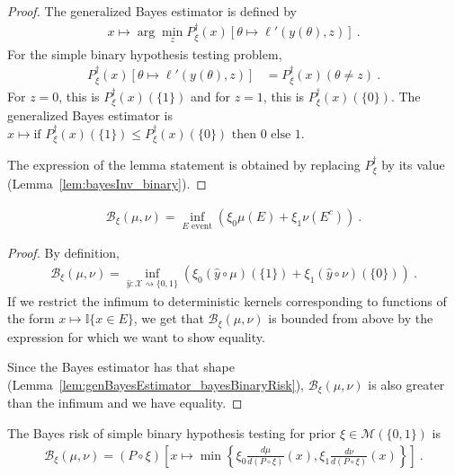 \begin{proof}\leanok
{}
The generalized Bayes estimator is defined by
\begin{align*}
x \mapsto \arg\min_z P_\xi^\dagger(x)\left[\theta \mapsto \ell'(y(\theta), z)\right] \: .
\end{align*}
For the simple binary hypothesis testing problem,
\begin{align*}
P_\xi^\dagger(x)\left[\theta \mapsto \ell'(y(\theta), z)\right]
&= P_\xi^\dagger(x)(\theta \ne z)
\: .
\end{align*}
For $z = 0$, this is $P_\xi^\dagger(x)(\{1\})$ and for $z = 1$, this is $P_\xi^\dagger(x)(\{0\})$.
The generalized Bayes estimator is $x \mapsto \text{if } P_\xi^\dagger(x)(\{1\}) \le P_\xi^\dagger(x)(\{0\}) \text{ then } 0 \text{ else } 1$.

The expression of the lemma statement is obtained by replacing $P_\xi^\dagger$ by its value (Lemma~\ref{lem:bayesInv_binary}).
\end{proof}


\begin{lemma}
  \label{lem:bayesBinaryRisk_eq_event}
  \leanok
  \begin{align*}
  \mathcal B_\xi(\mu, \nu) = \inf_{E \text{ event}} \left( \xi_0 \mu(E) + \xi_1 \nu(E^c) \right) \: .
  \end{align*}
\end{lemma}

\begin{proof}\leanok
{}
By definition,
\begin{align*}
\mathcal B_\xi(\mu, \nu)
= \inf_{\hat{y} : \mathcal X \rightsquigarrow \{0,1\}}\left(\xi_0 (\hat{y} \circ \mu)(\{1\}) + \xi_1 (\hat{y} \circ \nu)(\{0\})\right)
\: .
\end{align*}
If we restrict the infimum to deterministic kernels corresponding to functions of the form $x \mapsto \mathbb{I}\{x \in E\}$, we get that $\mathcal B_\xi(\mu, \nu)$ is bounded from above by the expression for which we want to show equality.

Since the Bayes estimator has that shape (Lemma~\ref{lem:genBayesEstimator_bayesBinaryRisk}), $\mathcal B_\xi(\mu, \nu)$ is also greater than the infimum and we have equality.
\end{proof}


\begin{theorem}
  \label{thm:bayesBinaryRisk_eq}
  \leanok
  The Bayes risk of simple binary hypothesis testing for prior $\xi \in \mathcal M(\{0,1\})$ is
  \begin{align*}
  \mathcal B_\xi(\mu, \nu) = (P \circ \xi)\left[x \mapsto \min \left\{\xi_0\frac{d \mu}{d(P \circ \xi)}(x), \xi_1\frac{d \nu}{d(P \circ \xi)}(x)\right\}\right]
  \: .
  \end{align*}
\end{theorem}

